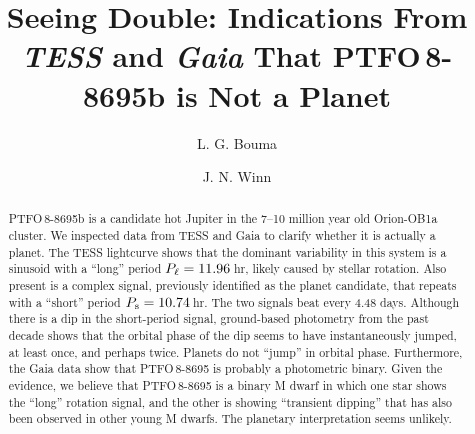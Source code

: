 \documentclass[12pt,twocolumn,tighten]{aastex62}
\begin{document}

\title{Seeing Double: Indications From {\it TESS} and {\it Gaia} That
PTFO$\,$8-8695b is Not a Planet}


%
%
\author[0000-0002-0514-5538]{L. G. Bouma}
%
\author[0000-0002-4265-047X]{J. N. Winn}

\begin{abstract}
  PTFO$\,$8-8695b is a candidate hot Jupiter in the 7--10 million year old
  Orion-OB1a cluster. We inspected data from TESS and Gaia to clarify whether
  it is actually a planet.  The TESS lightcurve shows that the dominant
  variability in this system is a sinusoid with a ``long'' period $P_{\rm
  \ell}=11.96\,$hr, likely caused by stellar rotation.  Also present is a
  complex signal, previously identified as the planet candidate, that repeats
  with a ``short'' period $P_{\rm s}= 10.74\,$hr.  The two signals beat every
  4.48 days.  Although there is a dip in the short-period signal, ground-based
  photometry from the past decade shows that the orbital phase of the dip seems
  to have instantaneously jumped, at least once, and perhaps twice.  Planets do
  not ``jump'' in orbital phase.  Furthermore, the Gaia data show that
  PTFO$\,$8-8695 is probably a photometric binary.  Given the evidence, we
  believe that PTFO$\,$8-8695 is a binary M dwarf in which one star shows the
  ``long'' rotation signal, and the other is showing ``transient dipping'' that
  has also been observed in other young M dwarfs.  The planetary interpretation
  seems unlikely.
\end{abstract}


\end{document}
